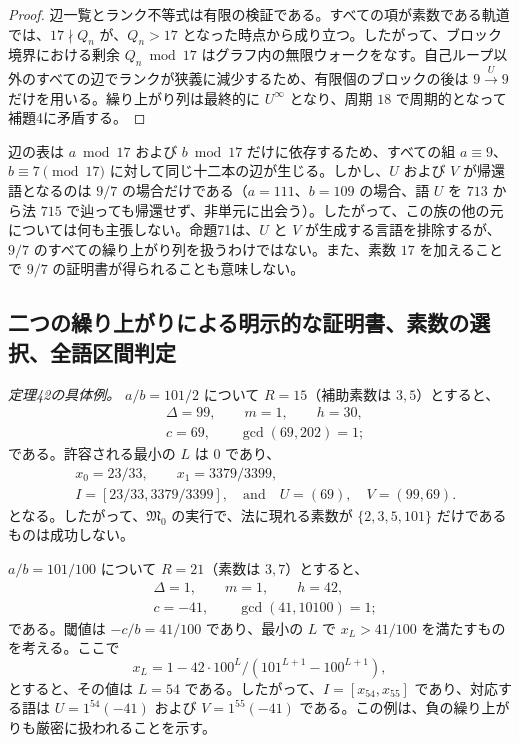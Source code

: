 \documentclass[11pt,reqno]{amsart}
\theoremstyle{definition}
\theoremstyle{definition}
\theoremstyle{remark}
\begin{document}
\begin{proof}\leavevmode\label{proof:71}
辺一覧とランク不等式は有限の検証である。すべての項が素数である軌道では、\(17\nmid Q_n\) が、\(Q_n>17\) となった時点から成り立つ。したがって、ブロック境界における剰余 \(Q_n\bmod17\) はグラフ内の無限ウォークをなす。自己ループ以外のすべての辺でランクが狭義に減少するため、有限個のブロックの後は \(9\xrightarrow{U}9\) だけを用いる。繰り上がり列は最終的に \(U^\infty\) となり、周期 \(18\) で周期的となって補題4に矛盾する。\qedhere
\end{proof}

辺の表は \(a\bmod17\) および \(b\bmod17\) だけに依存するため、すべての組 \(a\equiv9\)、\(b\equiv7\pmod{17}\) に対して同じ十二本の辺が生じる。しかし、\(U\) および \(V\) が帰還語となるのは \(9/7\) の場合だけである（\(a=111\)、\(b=109\) の場合、語 \(U\) を \(713\) から法 \(715\) で辿っても帰還せず、非単元に出会う）。したがって、この族の他の元については何も主張しない。命題71は、\(U\) と \(V\) が生成する言語を排除するが、\(9/7\) のすべての繰り上がり列を扱うわけではない。また、素数 \(17\) を加えることで \(9/7\) の証明書が得られることも意味しない。

\subsection{二つの繰り上がりによる明示的な証明書、素数の選択、全語区間判定}\label{sec:E.4}

\emph{定理42の具体例。} \(a/b=101/2\) について \(R=15\)（補助素数は \(3,5\)）とすると、
\[
\begin{aligned}
&\Delta=99,\qquad m=1,\qquad h=30,\\
&c=69,\qquad \gcd(69,202)=1;
\end{aligned}
\]
である。許容される最小の \(L\) は \(0\) であり、
\[
\begin{aligned}
&x_0=23/33,\qquad x_1=3379/3399,\\
&I=[23/33,3379/3399],\quad\text{and}\quad U=(69),\quad V=(99,69).
\end{aligned}
\]
となる。したがって、\(\mathfrak M_0\) の実行で、法に現れる素数が \(\{2,3,5,101\}\) だけであるものは成功しない。

\(a/b=101/100\) について \(R=21\)（素数は \(3,7\)）とすると、
\[
\begin{aligned}
&\Delta=1,\qquad m=1,\qquad h=42,\\
&c=-41,\qquad \gcd(41,10100)=1;
\end{aligned}
\]
である。閾値は \(-c/b=41/100\) であり、最小の \(L\) で \(x_L>41/100\) を満たすものを考える。ここで
\[
x_L=1-42\cdot100^L/(101^{L+1}-100^{L+1}),
\]
とすると、その値は \(L=54\) である。したがって、\(I=[x_{54},x_{55}]\) であり、対応する語は \(U=1^{54}(-41)\) および \(V=1^{55}(-41)\) である。この例は、負の繰り上がりも厳密に扱われることを示す。
\end{document}
